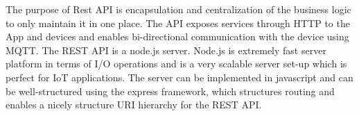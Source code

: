 The purpose of Rest API is encapsulation and centralization of the business logic to only maintain it in one place. The API exposes services through HTTP to the App and devices and enables bi-directional communication with the device using MQTT. The REST API is a node.js server. Node.js is extremely fast server platform in terms of I/O operations and is a very scalable server set-up which is perfect for IoT applications. The server can be implemented in javascript and can be well-structured using the express framework, which structures routing and enables a nicely structure URI hierarchy for the REST API.  